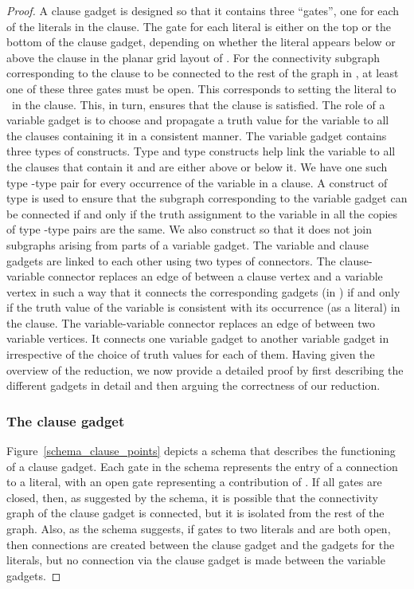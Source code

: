 \begin{proof}
A clause gadget is designed so that it contains three ``gates'', one for each of the literals in the clause. The gate for each
literal is either on the top or the bottom of the clause gadget, depending on whether the literal appears below or above the
clause in the planar grid layout of . For the connectivity subgraph corresponding to the
clause to be connected to the rest of the graph in , at least one of these three gates must be open. This corresponds
to setting the literal to \true\ in the clause. This, in turn, ensures that the clause is satisfied. 
The role of a variable gadget is to choose and propagate a truth value
for the variable to all the clauses containing it in a consistent
manner. The variable gadget contains three types of constructs. Type
 and type  constructs help link the variable to all the clauses
that contain it and are either above or below it. We have one such
type -type  pair for every occurrence of the variable in a
clause. A construct of type  is used to ensure that the subgraph
corresponding to the variable gadget can be connected if and only if
the truth assignment to the variable in all the copies of type
-type  pairs are the same.  We also construct  so that it
does not join subgraphs arising from parts of a variable
gadget. 
The variable and clause gadgets are linked to each other using two
types of connectors. The clause-variable connector replaces an edge of
 between a clause vertex and a variable vertex in such a way
that it connects the corresponding gadgets (in ) if and only if
the truth value of the variable is consistent with its occurrence (as
a literal) in the clause.  The variable-variable connector replaces an
edge of  between two variable vertices. It connects one
variable gadget to another variable gadget in  irrespective of
the choice of truth values for each of
them. 
Having given the overview of the reduction, we now provide a detailed proof by first describing the different  gadgets in detail and then  arguing the correctness of our reduction.

\subsubsection*{The clause gadget}

Figure~\ref{schema_clause_points} depicts a schema that describes the functioning of a clause gadget.  Each gate in the schema represents the entry of a connection to a literal, with an open gate representing a contribution of \true.  If all gates are closed, then, as suggested by the schema, it is possible that the connectivity graph of the clause gadget is connected, but it is isolated from the rest of the graph.  Also, as the schema suggests,  if gates to two literals  and  are both open, then connections are created between the clause gadget and the gadgets for the literals, but no connection via the clause gadget is made between the variable gadgets.


\end{proof}
